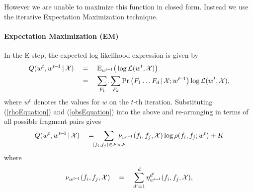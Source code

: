 However we are unable to maximize this function in closed form. 
Instead we use the iterative Expectation Maximization \citep{Dempster1977} technique.

\paragraph{Expectation Maximization (EM)}

In the E-step, the expected log likelihood expression is given by
\begin{align}
Q(w^{t},w^{t\hspace{-1pt}-\hspace{-1pt}1}\,|\,\mathcal{X})
&\quad=\quad\mathbb{E}_{w^{t\hspace{-1pt}-\hspace{-1pt}1}}\big(\log{\mathcal{L}(w^{t},\mathcal{X})}\big) \\
&\quad=\quad\sum\limits_{F_{1}}\hspace{-6pt}\dots\hspace{-4pt}\sum\limits_{F_{d}}\Pr\big(F_{1} \dots F_{d} \,|\, \mathcal{X}; w^{t\hspace{-1pt}-\hspace{-1pt}1}\big)\log{\mathcal{L}(w^{t},\mathcal{X})},
\end{align}
where $w^{t}$ denotes the values for $w$ on the $t$-th iteration. Substituting (\ref{rhoEquation}) and (\ref{obsEquation}) into the above and re-arranging in terms of all possible fragment pairs gives
\begin{align}
Q(w^{t},w^{t\hspace{-1pt}-\hspace{-1pt}1}\,|\,\mathcal{X})\quad = \hspace{-5pt}\sum\limits_{(f_{i},f_{j}) \in \mathcal{F}\times\mathcal{F}} \hspace{-12pt} \nu_{w^{t\hspace{-1pt}-\hspace{-1pt}1}}(f_{i},f_{j},\mathcal{X})\log\rho(f_{i},f_{j};w^{t}) + K
\end{align}
where 
\begin{equation*}
\label{nuEquation}
\nu_{w^{t\hspace{-1pt}-\hspace{-1pt}1}}(f_{i},f_{j},\mathcal{X}) \quad=\quad \sum\limits_{d'=1}^{d}\eta_{w^{t\hspace{-1pt}-\hspace{-1pt}1}}^{d'}(f_{i},f_{j},\mathcal{X}),
\end{equation*}
